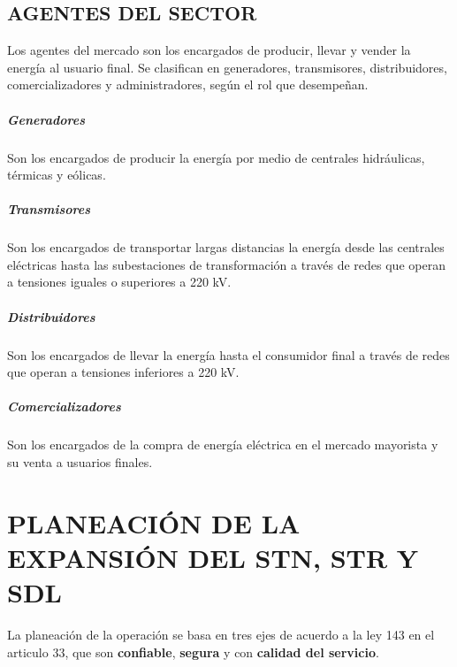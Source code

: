 \documentclass[a5paper]{book}%
\begin{document}
\section{AGENTES DEL SECTOR}
Los agentes del mercado son los encargados de producir, llevar y vender la energía al usuario final. Se clasifican en generadores, transmisores, distribuidores, comercializadores y administradores, según el rol que desempeñan.

\paragraph{Generadores}

Son los encargados de producir la energía por medio de centrales hidráulicas, térmicas y eólicas.
\paragraph{Transmisores}

Son los encargados de transportar largas distancias la energía desde las centrales eléctricas hasta las subestaciones de transformación a través de redes que operan a tensiones iguales o superiores a 220 kV.
\paragraph{Distribuidores}

Son los encargados de llevar la energía hasta el consumidor final a través de redes que operan a tensiones inferiores a 220 kV.
\paragraph{Comercializadores}

Son los encargados de la compra de energía eléctrica en el mercado mayorista y su venta a usuarios finales.

  
\chapter{PLANEACIÓN DE LA EXPANSIÓN DEL STN, STR Y SDL }

La planeación de la operación se basa en tres ejes de acuerdo a la ley 143 \cite{LEY143} en el articulo 33, que son \textbf{confiable}, \textbf{segura} y con \textbf{calidad del servicio}.\\
\end{document}
